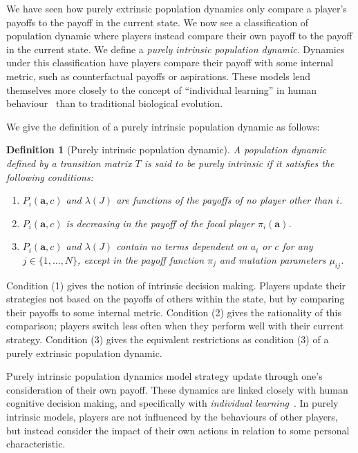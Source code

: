 \documentclass{article}
\newtheorem{definition}{Definition}
\begin{document}
We have seen how purely extrinsic population dynamics only compare a player's
payoffs to the payoff in the current state. We now see a classification of
population dynamic where players instead compare their own payoff to the payoff
in the current state. We define a \emph{purely intrinsic population dynamic}.
Dynamics under this classification have players compare their payoff with some
internal metric, such as counterfactual payoffs or aspirations. These models
lend themselves more closely to the concept of ``individual learning'' in human
behaviour~\cite{RogersCulture} than to traditional biological evolution. 

We give the definition of a purely intrinsic population dynamic as follows:

\begin{definition}[Purely intrinsic population dynamic]
    A population dynamic defined by a transition matrix \(T\) 
    is said to be \emph{purely intrinsic} if it satisfies the following conditions:
    \begin{enumerate}
        \item \(P_i(\mathbf{a}, c)\) and \(\lambda(J)\) are functions of the
        payoffs of no player other than \(i\). 
        \item \(P_i(\mathbf{a}, c)\) is decreasing in the payoff of the focal
        player \(\pi_i(\mathbf{a})\).
        \item \(P_i(\mathbf{a}, c)\) and \(\lambda(J)\) contain no terms
        dependent on \(a_i\) or \(c\) for any \(j \in \{1, \dots, N\}\), except
        in the payoff function \(\pi_j\) and mutation parameters \(\mu_{ij}\).
    \end{enumerate}
\end{definition}

Condition (1) gives the notion of intrinsic decision making. Players update
their strategies not based on the payoffs of others within the state, but by
comparing their payoffs to some internal metric. Condition (2) gives the
rationality of this comparison; players switch less often when they perform well
with their current strategy. Condition (3) gives the equivalent restrictions as
condition (3) of a purely extrinsic population dynamic.

Purely intrinsic population dynamics model strategy update through one's
consideration of their own payoff. These dynamics are linked closely with human
cognitive decision making, and specifically with \emph{individual
learning}~\cite{molleman_consistent_2014, RogersCulture}. In purely intrinsic
models, players are not influenced by the behaviours of other players, but
instead consider the impact of their own actions in relation to some personal
characteristic. 
\end{document}
